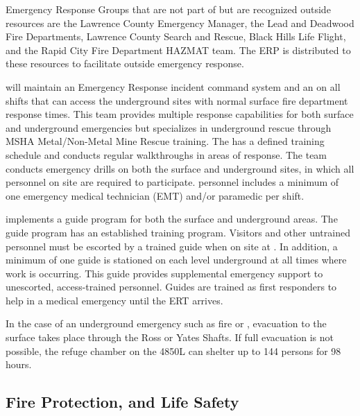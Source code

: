 Emergency Response Groups that are not part of  but are recognized
outside resources are the Lawrence County Emergency Manager, the Lead and
Deadwood Fire Departments, Lawrence County Search and Rescue, Black
Hills Life Flight, and the Rapid City Fire Department HAZMAT team. The
 ERP is distributed to these resources to facilitate outside
emergency response.

 will maintain an Emergency Response incident command
system and an  on all shifts that can access the
underground sites with normal surface fire department response
times. This team provides multiple response capabilities for both
surface and underground emergencies but specializes in underground
rescue through MSHA Metal/Non-Metal Mine Rescue training. %
The  has a defined training schedule and conducts regular
walkthroughs in areas of response. The team conducts  emergency drills 
on both the surface and underground sites, in which all personnel on
site are required to participate.  personnel includes a
minimum of one emergency medical technician (EMT) and/or paramedic per
shift. 

 implements a guide program for both the surface and
underground areas. The guide program has an established training
program.  Visitors and other untrained personnel must be escorted by a trained
guide when on site at . %
In addition, a minimum of one guide is stationed on each %
level underground at all times where work is occurring. This guide provides
supplemental emergency support to unescorted, access-trained
personnel. Guides are trained as first responders to help in a medical
emergency until the ERT arrives.

In the case of an underground emergency such as fire or ,
evacuation to the surface takes place through the Ross or Yates Shafts.
If full evacuation is not  possible, the refuge chamber on the 4850L
 can shelter up to 144 persons for 98 hours.

\subsection{Fire Protection,  and Life Safety}

